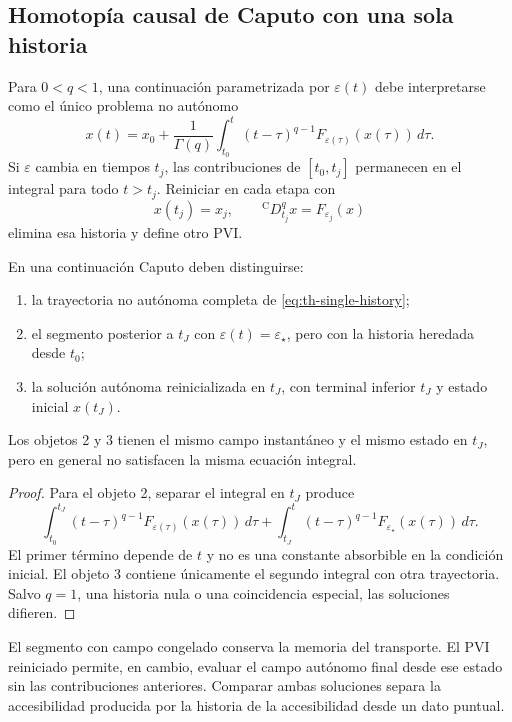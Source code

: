\subsection{Homotopía causal de Caputo con una sola historia}
\label{sec:single-history}

Para \(0<q<1\), una continuación parametrizada por
\(\varepsilon(t)\) debe interpretarse como el único problema no autónomo
\begin{equation}
 x(t)=x_0+\frac1{\Gamma(q)}
 \int_{t_0}^{t}(t-\tau)^{q-1}
 F_{\varepsilon(\tau)}(x(\tau))\,d\tau.
 \label{eq:th-single-history}
\end{equation}
Si \(\varepsilon\) cambia en tiempos \(t_j\), las contribuciones de
\([t_0,t_j]\) permanecen en el integral para todo \(t>t_j\). Reiniciar en cada
etapa con
\[
 x(t_j)=x_j,\qquad
 {}^{\mathrm C}D_{t_j}^q x=F_{\varepsilon_j}(x)
\]
elimina esa historia y define otro PVI.

\begin{proposition}
\label{prop:history-three-objects}
En una continuación Caputo deben distinguirse:
\begin{enumerate}
 \item la trayectoria no autónoma completa de
 \cref{eq:th-single-history};
 \item el segmento posterior a \(t_J\) con
 \(\varepsilon(t)=\varepsilon_\star\), pero con la historia heredada desde
 \(t_0\);
 \item la solución autónoma reinicializada en \(t_J\), con terminal inferior
 \(t_J\) y estado inicial \(x(t_J)\).
\end{enumerate}
Los objetos 2 y 3 tienen el mismo campo instantáneo y el mismo estado en
\(t_J\), pero en general no satisfacen la misma ecuación integral.
\end{proposition}

\begin{proof}
Para el objeto 2, separar el integral en \(t_J\) produce
\[
 \int_{t_0}^{t_J}(t-\tau)^{q-1}
 F_{\varepsilon(\tau)}(x(\tau))\,d\tau
 +\int_{t_J}^{t}(t-\tau)^{q-1}
 F_{\varepsilon_\star}(x(\tau))\,d\tau.
\]
El primer término depende de \(t\) y no es una constante absorbible en la
condición inicial. El objeto 3 contiene únicamente el segundo integral con
otra trayectoria. Salvo \(q=1\), una historia nula o una coincidencia
especial, las soluciones difieren.
\end{proof}

El segmento con campo congelado conserva la memoria del transporte. El PVI
reiniciado permite, en cambio, evaluar el campo autónomo final desde ese
estado sin las contribuciones anteriores. Comparar ambas soluciones separa
la accesibilidad producida por la historia de la accesibilidad desde un dato
puntual.


